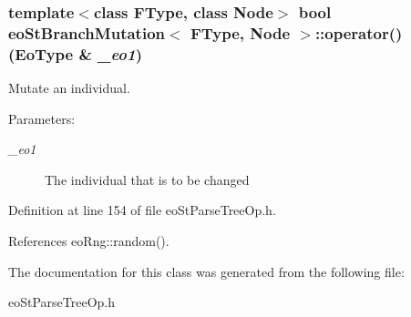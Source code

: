 \subsubsection{\setlength{\rightskip}{0pt plus 5cm}template$<$class FType, class Node$>$ bool {\bf eo\-St\-Branch\-Mutation}$<$ FType, Node $>$::operator() ({\bf Eo\-Type} \& {\em \_\-eo1})\hspace{0.3cm}{\tt  [inline]}}\label{classeo_st_branch_mutation_a3}


Mutate an individual. 

\begin{Desc}
\item[Parameters:]
\begin{description}
\item[{\em \_\-eo1}]The individual that is to be changed \end{description}
\end{Desc}


Definition at line 154 of file eo\-St\-Parse\-Tree\-Op.h.

References eo\-Rng::random().

The documentation for this class was generated from the following file:\begin{CompactItemize}
\item 
eo\-St\-Parse\-Tree\-Op.h\end{CompactItemize}
